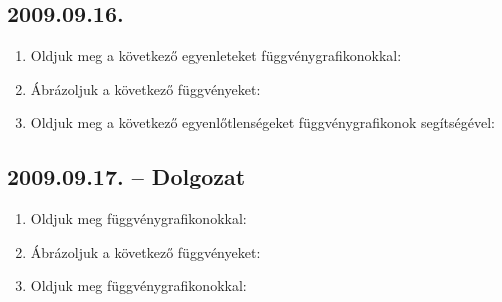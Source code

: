 \subsection*{2009.09.16.}
\begin{enumerate}
\item Oldjuk meg a következő egyenleteket függvénygrafikonokkal:
\item Ábrázoljuk a következő függvényeket:
\item Oldjuk meg a következő egyenlőtlenségeket függvénygrafikonok
segítségével:
\end{enumerate}

\subsection*{2009.09.17. -- Dolgozat}
\begin{enumerate}
\item Oldjuk meg függvénygrafikonokkal:
\item Ábrázoljuk a következő függvényeket:
\item Oldjuk meg függvénygrafikonokkal:
\end{enumerate}

